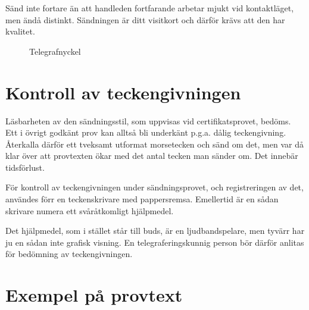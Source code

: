 Sänd inte fortare än att handleden fortfarande arbetar mjukt vid kontaktläget,
men ändå distinkt.
Sändningen är ditt visitkort och därför krävs att den har kvalitet.

\begin{figure}
  \caption{Telegrafnyckel}
  \label{fig:bild_morse_6}
\end{figure}

\section[Teckengivning]{Kontroll av teckengivningen}

Läsbarheten av den sändningsstil, som uppvisas vid certifikatsprovet, bedöms.
Ett i övrigt godkänt prov kan alltså bli underkänt p.g.a. dålig teckengivning.
Återkalla därför ett tveksamt utformat morsetecken och sänd om det, men var då
klar över att provtexten ökar med det antal tecken man sänder om.
Det innebär tidsförlust.

För kontroll av teckengivningen under sändningsprovet, och registreringen av
det, användes förr en teckenskrivare med pappersremsa.
Emellertid är en sådan skrivare numera ett svåråtkomligt hjälpmedel.

Det hjälpmedel, som i stället står till buds, är en ljudbandspelare, men tyvärr
har ju en sådan inte grafisk visning.
En telegraferingskunnig person bör därför anlitas för bedömning av
teckengivningen.

\section[Provtext]{Exempel på provtext}

